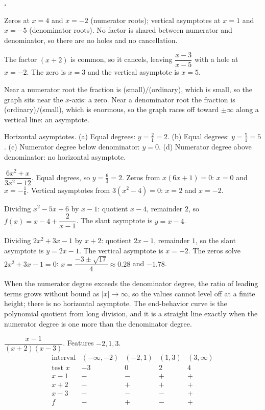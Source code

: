 \documentclass[12pt]{book}
\newcounter{soln}[section]
\newenvironment{solutions}{%
  \setcounter{soln}{0}%
  \begin{list}{\textbf{\arabic{soln}.}}{%
    \usecounter{soln}\setlength{\leftmargin}{2.2em}\setlength{\itemsep}{10pt}}%
}{\end{list}}
\begin{document}
\begin{solutions}
\item Zeros at $x=4$ and $x=-2$ (numerator roots); vertical asymptotes at $x=1$ and
$x=-5$ (denominator roots). No factor is shared between numerator and denominator, so
there are no holes and no cancellation.

\item The factor $(x+2)$ is common, so it cancels, leaving $\dfrac{x-3}{x-5}$ with a
hole at $x=-2$. The zero is $x=3$ and the vertical asymptote is $x=5$.

\item Near a numerator root the fraction is (small)$/$(ordinary), which is small, so the
graph sits near the $x$-axis: a zero. Near a denominator root the fraction is
(ordinary)$/$(small), which is enormous, so the graph races off toward $\pm\infty$
along a vertical line: an asymptote.

\item Horizontal asymptotes. (a) Equal degrees: $y=\tfrac{2}{1}=2$. (b) Equal degrees:
$y=\tfrac{5}{1}=5$. (c) Numerator degree below denominator: $y=0$. (d) Numerator degree
above denominator: no horizontal asymptote.

\item $\dfrac{6x^2+x}{3x^2-12}$. Equal degrees, so $y=\tfrac{6}{3}=2$. Zeros from
$x(6x+1)=0$: $x=0$ and $x=-\tfrac16$. Vertical asymptotes from $3(x^2-4)=0$: $x=2$ and
$x=-2$.

\item Dividing $x^2-5x+6$ by $x-1$: quotient $x-4$, remainder $2$, so
$f(x)=x-4+\dfrac{2}{x-1}$. The slant asymptote is $y=x-4$.

\item Dividing $2x^2+3x-1$ by $x+2$: quotient $2x-1$, remainder $1$, so the slant
asymptote is $y=2x-1$. The vertical asymptote is $x=-2$. The zeros solve
$2x^2+3x-1=0$: $x=\dfrac{-3\pm\sqrt{17}}{4}\approx 0.28$ and $-1.78$.

\item When the numerator degree exceeds the denominator degree, the ratio of leading
terms grows without bound as $|x|\to\infty$, so the values cannot level off at a finite
height; there is no horizontal asymptote. The end-behavior curve is the polynomial
quotient from long division, and it is a straight line exactly when the numerator
degree is one more than the denominator degree.

\item $\dfrac{x-1}{(x+2)(x-3)}$. Features $-2,1,3$.
\[
\begin{array}{c|cccc}
\text{interval} & (-\infty,-2) & (-2,1) & (1,3) & (3,\infty)\\\hline
\text{test }x & -3 & 0 & 2 & 4\\
x-1 & - & - & + & +\\
x+2 & - & + & + & +\\
x-3 & - & - & - & +\\\hline
f & - & + & - & +
\end{array}
\]


\end{solutions}
\end{document}
